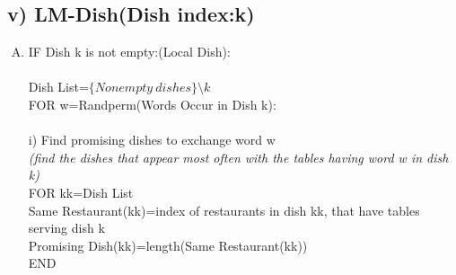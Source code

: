 \documentclass{article}
\begin{document}
\begin{spacing}{1.1}
\subsection{v) LM-Dish(Dish index:k)}
\begin{enumerate}[(A)]
\item IF Dish k is not empty:(Local Dish):\\ \\
Dish List=$\{Nonempty \ dishes\}\setminus k$\\ 
FOR w=Randperm(Words Occur in Dish k):\\ \\
i) Find promising dishes to exchange word w \\   
\small{\emph{(find the dishes that appear most often with the tables having word w in dish k)}}\\
FOR kk=Dish List\\
Same Restaurant(kk)=index of restaurants in dish kk, that have tables serving dish k\\
Promising Dish(kk)=length(Same Restaurant(kk))\\
END\\ \\


\end{enumerate}
\end{spacing}
\end{document}
